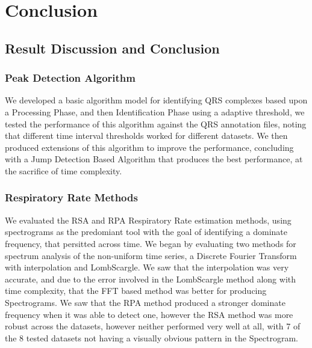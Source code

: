 \chapter{Conclusion}\label{ch:conclusion}

\section{Result Discussion and Conclusion}
\subsection{Peak Detection Algorithm}
We developed a basic algorithm model for identifying QRS complexes based upon a Processing Phase, and then 
Identification Phase using a adaptive threshold, we tested the performance of this algorithm against the QRS annotation 
files, noting that different time interval thresholds worked for different datasets. We then produced extensions of this algorithm to improve 
the performance, concluding with a Jump Detection Based Algorithm that produces the best performance, at the sacrifice 
of time complexity. 
\subsection{Respiratory Rate Methods}
We evaluated the RSA and RPA Respiratory Rate estimation methods, using spectrograms as the predomiant tool with the goal 
of identifying a dominate frequency, that persitted across time. We began by evaluating two methods 
for spectrum analysis of the non-uniform time series, a Discrete Fourier Transform with interpolation and LombScargle. 
We saw that the interpolation was very accurate, and due to the error involved in the LombScargle method along 
with time complexity, that the FFT based method was better for producing Spectrograms. We saw that the RPA method 
produced a stronger dominate frequency when it was able to detect one, however the RSA method was more robust across 
the datasets, however neither performed very well at all, with 7 of the 8 tested datasets not having a visually obvious pattern 
in the Spectrogram. 
